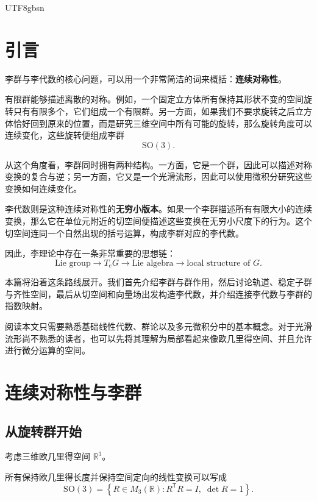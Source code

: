 \documentclass[11pt]{article}
\begin{document}
\begin{CJK*}{UTF8}{gbsn}

\maketitle

\section*{引言}

李群与李代数的核心问题，可以用一个非常简洁的词来概括：\textbf{连续对称性}。

有限群能够描述离散的对称。例如，一个固定立方体所有保持其形状不变的空间旋转只有有限多个，它们组成一个有限群。另一方面，如果我们不要求旋转之后立方体恰好回到原来的位置，而是研究三维空间中所有可能的旋转，那么旋转角度可以连续变化，这些旋转便组成李群
\[
\mathrm{SO}(3).
\]

从这个角度看，李群同时拥有两种结构。一方面，它是一个群，因此可以描述对称变换的复合与逆；另一方面，它又是一个光滑流形，因此可以使用微积分研究这些变换如何连续变化。

李代数则是这种连续对称性的\textbf{无穷小版本}。如果一个李群描述所有有限大小的连续变换，那么它在单位元附近的切空间便描述这些变换在无穷小尺度下的行为。这个切空间连同一个自然出现的括号运算，构成李群对应的李代数。

因此，李理论中存在一条非常重要的思想链：
\[
\text{Lie group}
\longrightarrow
T_eG
\longrightarrow
\text{Lie algebra}
\longrightarrow
\text{local structure of }G.
\]

本篇将沿着这条路线展开。我们首先介绍李群与群作用，然后讨论轨道、稳定子群与齐性空间，最后从切空间和向量场出发构造李代数，并介绍连接李代数与李群的指数映射。

阅读本文只需要熟悉基础线性代数、群论以及多元微积分中的基本概念。对于光滑流形尚不熟悉的读者，也可以先将其理解为局部看起来像欧几里得空间、并且允许进行微分运算的空间。


\section{连续对称性与李群}

\subsection{从旋转群开始}

考虑三维欧几里得空间 $\mathbb{R}^3$。

所有保持欧几里得长度并保持空间定向的线性变换可以写成
\[
\mathrm{SO}(3)
=
\left\{
R\in M_3(\mathbb{R})
:
R^{\mathsf T}R=I,\;
\det R=1
\right\}.
\]


\end{CJK*}
\end{document}
